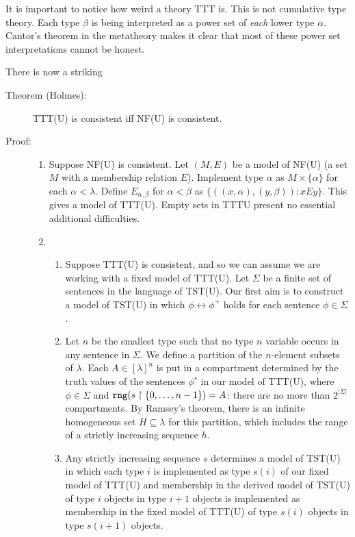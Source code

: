 \documentclass[112pt]{article}
\begin{document}
It is important to notice how weird a theory TTT is.  This is not cumulative type theory.  Each type $\beta$ is being interpreted as a power set of {\em each\/} lower type $\alpha$.  Cantor's theorem in the metatheory makes it clear that most of these power set interpretations cannot be honest.

There is now a striking

\begin{description}

\item[Theorem (Holmes):]  TTT(U) is consistent iff NF(U) is consistent.

\item[Proof:]  
\begin{enumerate}

\item Suppose NF(U) is consistent.  Let $(M,E)$ be a model of NF(U) (a set $M$ with a membership relation $E$).  Implement type $\alpha$ as $M \times \{\alpha\}$ for
each $\alpha<\lambda$.  Define $E_{\alpha,\beta}$ for $\alpha<\beta$ as $\{((x,\alpha),(y,\beta)):xEy\}$.  This gives a model of TTT(U).   Empty sets in TTTU present no essential additional difficulties.

\item \begin{enumerate}


\item Suppose TTT(U) is consistent, and so we can assume we are working with a fixed model of TTT(U).  Let $\Sigma$ be a finite set of sentences in the language of TST(U).  Our first aim is to construct a model of TST(U) in which $\phi \leftrightarrow \phi^+$ holds for each sentence $\phi \in \Sigma$.

\item Let $n$ be the smallest type such that no type $n$ variable occurs in any sentence in $\Sigma$.  We define a partition of the $n$-element subsets of $\lambda$.  Each $A \in [\lambda]^n$ is put in a compartment
determined by the truth values of the sentences $\phi^s$ in our model of TTT(U), where $\phi \in \Sigma$ and ${\tt rng}(s \restriction \{0,\ldots,n-1\}) = A$:  there are no more than $2^{|\Sigma|}$ compartments.  By Ramsey's theorem, there is an infinite homogeneous set $H \subseteq \lambda$ for this partition, which includes the range of a strictly increasing sequence $h$.  

\item Any strictly increasing sequence $s$ determines a model of TST(U) in which each type $i$ is implemented as type $s(i)$ of our fixed model of TTT(U)  and membership in the derived model of TST(U) of type $i$ objects in type $i+1$ objects is implemented as membership in the fixed model of TTT(U) of type $s(i)$ objects in type $s(i+1)$ objects.


\end{enumerate}
\end{enumerate}
\end{description}
\end{document}
